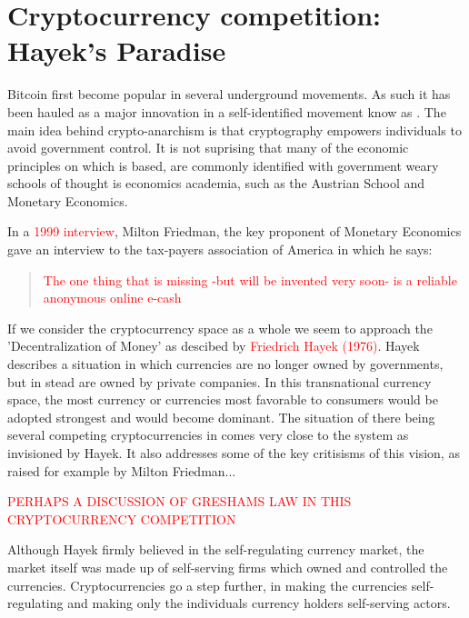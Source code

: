 
\chapter{Cryptocurrency competition: Hayek's Paradise}

Bitcoin first become popular in several underground movements. As
such it has been hauled as a major innovation in a self-identified
movement know as . The main idea
behind crypto-anarchism is that cryptography empowers individuals
to avoid government control. It is not suprising that many of the
economic principles on which  is based,
are commonly identified with government weary schools of thought is
economics academia, such as the Austrian School and Monetary Economics. 

In a \textcolor{red}{1999 interview}, Milton Friedman, the key proponent
of Monetary Economics gave an interview to the tax-payers association
of America in which he says:
\begin{quotation}
\textcolor{red}{The one thing that is missing -but will be invented
very soon- is a reliable anonymous online e-cash}
\end{quotation}
If we consider the cryptocurrency space as a whole we seem to approach
the 'Decentralization of Money' as descibed by \textcolor{red}{Friedrich
Hayek (1976)}. Hayek describes a situation in which currencies are
no longer owned by governments, but in stead are owned by private
companies. In this transnational currency space, the most currency
or currencies most favorable to consumers would be adopted strongest
and would become dominant. The situation of there being several competing
cryptocurrencies in comes very close to the system as invisioned by
Hayek. It also addresses some of the key critisisms of this vision,
as raised for example by Milton Friedman...

\textcolor{red}{PERHAPS A DISCUSSION OF GRESHAMS LAW IN THIS CRYPTOCURRENCY
COMPETITION}

Although Hayek firmly believed in the self-regulating currency market,
the market itself was made up of self-serving firms which owned and
controlled the currencies. Cryptocurrencies go a step further, in
making the currencies self-regulating and making only the individuals
currency holders self-serving actors.
